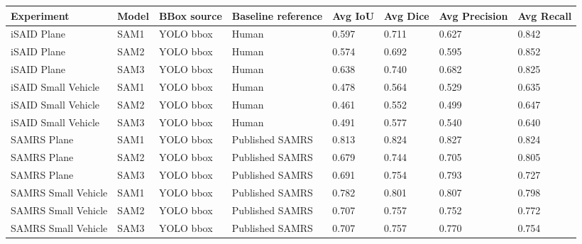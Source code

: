 \begin{tabular}{llllllll}
\toprule
Experiment & Model & BBox source & Baseline reference & Avg IoU & Avg Dice & Avg Precision & Avg Recall \\
\midrule
iSAID Plane & SAM1 & YOLO bbox & Human & 0.597 & 0.711 & 0.627 & 0.842 \\
iSAID Plane & SAM2 & YOLO bbox & Human & 0.574 & 0.692 & 0.595 & 0.852 \\
iSAID Plane & SAM3 & YOLO bbox & Human & 0.638 & 0.740 & 0.682 & 0.825 \\
iSAID Small Vehicle & SAM1 & YOLO bbox & Human & 0.478 & 0.564 & 0.529 & 0.635 \\
iSAID Small Vehicle & SAM2 & YOLO bbox & Human & 0.461 & 0.552 & 0.499 & 0.647 \\
iSAID Small Vehicle & SAM3 & YOLO bbox & Human & 0.491 & 0.577 & 0.540 & 0.640 \\
SAMRS Plane & SAM1 & YOLO bbox & Published SAMRS & 0.813 & 0.824 & 0.827 & 0.824 \\
SAMRS Plane & SAM2 & YOLO bbox & Published SAMRS & 0.679 & 0.744 & 0.705 & 0.805 \\
SAMRS Plane & SAM3 & YOLO bbox & Published SAMRS & 0.691 & 0.754 & 0.793 & 0.727 \\
SAMRS Small Vehicle & SAM1 & YOLO bbox & Published SAMRS & 0.782 & 0.801 & 0.807 & 0.798 \\
SAMRS Small Vehicle & SAM2 & YOLO bbox & Published SAMRS & 0.707 & 0.757 & 0.752 & 0.772 \\
SAMRS Small Vehicle & SAM3 & YOLO bbox & Published SAMRS & 0.707 & 0.757 & 0.770 & 0.754 \\
\bottomrule
\end{tabular}
